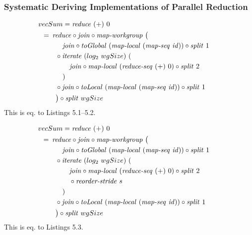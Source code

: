 \subsubsection{Systematic Deriving Implementations of Parallel Reduction}

\begin{align}
  &\hspace{-1.5em}vecSum = \reduce\ (+)\ 0\nonumber\\
  &\hspace{-2em}\quad\begin{aligned}
    &=\hspace{.2em}
      \reduce \circ \join \circ \mapWorkgroup\ \big(\\
      &\qquad\quad \join \circ \toGlobal\ (\mapLocal\ (\mapSeq\ \id)) \circ \splitN\ 1\\
      &\qquad \circ \iterateN\ (log_2\ wgSize)\ (\\
      &\qquad\qquad \join \circ \mapLocal\ (\reduceSeq\ (+)\ 0) \circ \splitN\ 2\\
      &\qquad\quad)\\
      &\qquad \circ \join \circ \toLocal\ (\mapLocal\ (\mapSeq\ \id)) \circ \splitN\ 1\\
      &\qquad\big) \circ \splitN\ wgSize
  \end{aligned}
\end{align}
This is eq. to Listings 5.1--5.2.

\begin{align}
  &\hspace{-1.5em}vecSum = \reduce\ (+)\ 0\nonumber\\
  &\hspace{-2em}\quad\begin{aligned}
    &=\hspace{.2em}
      \reduce \circ \join \circ \mapWorkgroup\ \big(\\
      &\qquad\quad \join \circ \toGlobal\ (\mapLocal\ (\mapSeq\ \id)) \circ \splitN\ 1\\
      &\qquad \circ \iterateN\ (log_2\ wgSize)\ (\\
      &\qquad\qquad \join \circ \mapLocal\ (\reduceSeq\ (+)\ 0) \circ \splitN\ 2\\
      &\qquad\qquad \circ \reorderStride\ s\\
      &\qquad\quad)\\
      &\qquad \circ \join \circ \toLocal\ (\mapLocal\ (\mapSeq\ \id)) \circ \splitN\ 1\\
      &\qquad\big) \circ \splitN\ wgSize
  \end{aligned}
\end{align}
This is eq. to Listings 5.3.

